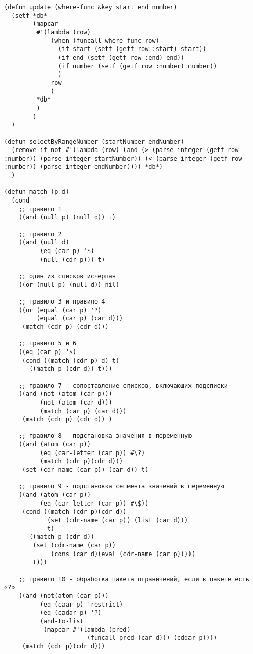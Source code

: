 \documentclass[a4paper,14pt]{extarticle}
\begin{document}
\begin{lstlisting}
(defun update (where-func &key start end number)
  (setf *db*
        (mapcar
         #'(lambda (row)
             (when (funcall where-func row)
               (if start (setf (getf row :start) start))
               (if end (setf (getf row :end) end))
               (if number (setf (getf row :number) number))
               )
             row
             )
         *db*
         )
        )
  )

(defun selectByRangeNumber (startNumber endNumber)
  (remove-if-not #'(lambda (row) (and (> (parse-integer (getf row :number)) (parse-integer startNumber)) (< (parse-integer (getf row :number)) (parse-integer endNumber)))) *db*)
  )

(defun match (p d)
  (cond
    ;; правило 1
    ((and (null p) (null d)) t)
    
    ;; правило 2
    ((and (null d)
          (eq (car p) '$)
          (null (cdr p))) t)
    
    ;; один из списков исчерпан
    ((or (null p) (null d)) nil)
    
    ;; правило 3 и правило 4
    ((or (equal (car p) '?)
         (equal (car p) (car d)))
     (match (cdr p) (cdr d)))
    
    ;; правило 5 и 6
    ((eq (car p) '$)
     (cond ((match (cdr p) d) t)
       ((match p (cdr d)) t)))
    
    ;; правило 7 - сопоставление списков, включающих подсписки
    ((and (not (atom (car p)))
          (not (atom (car d)))
          (match (car p) (car d)))
     (match (cdr p) (cdr d)) )
    
    ;; правило 8 – подстановка значения в переменную
    ((and (atom (car p))
          (eq (car-letter (car p)) #\?)
          (match (cdr p)(cdr d)))
     (set (cdr-name (car p)) (car d)) t)
    
    ;; правило 9 - подстановка сегмента значений в переменную
    ((and (atom (car p))
          (eq (car-letter (car p)) #\$))
     (cond ((match (cdr p)(cdr d))
            (set (cdr-name (car p)) (list (car d)))
            t)
       ((match p (cdr d))
        (set (cdr-name (car p))
             (cons (car d)(eval (cdr-name (car p)))))
        t)))
    
    ;; правило 10 - обработка пакета ограничений, если в пакете есть «?»
    ((and (not(atom (car p)))
          (eq (caar p) 'restrict)
          (eq (cadar p) '?)
          (and-to-list
           (mapcar #'(lambda (pred)
                       (funcall pred (car d))) (cddar p))))
     (match (cdr p)(cdr d)))
    

\end{lstlisting}
\end{document}
